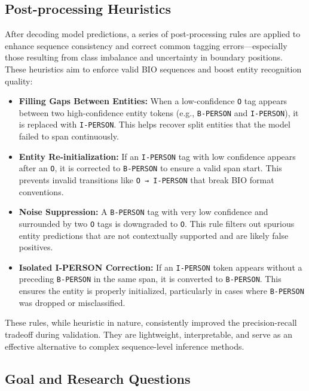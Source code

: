 \documentclass[a4paper]{usiinfbachelorproject}
\begin{document}
\subsection{Post-processing Heuristics}

After decoding model predictions, a series of post-processing rules are applied to enhance sequence consistency and correct common tagging errors—especially those resulting from class imbalance and uncertainty in boundary positions. These heuristics aim to enforce valid BIO sequences and boost entity recognition quality:

\begin{itemize}
    \item \textbf{Filling Gaps Between Entities:} When a low-confidence \texttt{O} tag appears between two high-confidence entity tokens (e.g., \texttt{B-PERSON} and \texttt{I-PERSON}), it is replaced with \texttt{I-PERSON}. This helps recover split entities that the model failed to span continuously.

    \item \textbf{Entity Re-initialization:} If an \texttt{I-PERSON} tag with low confidence appears after an \texttt{O}, it is corrected to \texttt{B-PERSON} to ensure a valid span start. This prevents invalid transitions like \texttt{O → I-PERSON} that break BIO format conventions.

    \item \textbf{Noise Suppression:} A \texttt{B-PERSON} tag with very low confidence and surrounded by two \texttt{O} tags is downgraded to \texttt{O}. This rule filters out spurious entity predictions that are not contextually supported and are likely false positives.

    \item \textbf{Isolated I-PERSON Correction:} If an \texttt{I-PERSON} token appears without a preceding \texttt{B-PERSON} in the same span, it is converted to \texttt{B-PERSON}. This ensures the entity is properly initialized, particularly in cases where \texttt{B-PERSON} was dropped or misclassified.

\end{itemize}

These rules, while heuristic in nature, consistently improved the precision-recall tradeoff during validation. They are lightweight, interpretable, and serve as an effective alternative to complex sequence-level inference methods.

\subsection{Goal and Research Questions}
\end{document}
